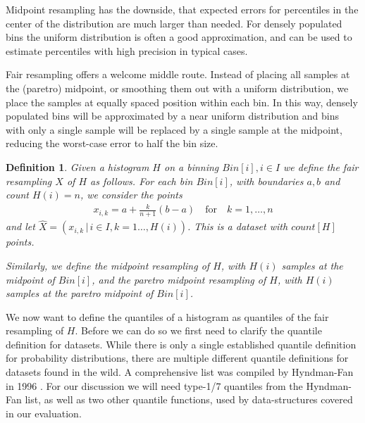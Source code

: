 \documentclass{article}
\theoremstyle{plain}
\newtheorem{definition}{Definition}[section]
\theoremstyle{remark}
\newcommand{\qtext}[1]{\quad\text{#1}\quad} %
\begin{document}
Midpoint resampling has the downside, that expected errors for percentiles in the center of the
distribution are much larger than needed. For densely populated bins the uniform distribution is
often a good approximation, and can be used to estimate percentiles with high precision in typical
cases.

Fair resampling offers a welcome middle route. Instead of placing all samples at the (paretro)
midpoint, or smoothing them out with a uniform distribution, we place the samples at equally
spaced position within each bin. In this way, densely populated bins will be approximated by a near
uniform distribution and bins with only a single sample will be replaced by a single sample at the
midpoint, reducing the worst-case error to half the bin size.

\begin{definition}
  Given a histogram $H$ on a binning $Bin[i], i \in I$ we define the fair resampling $X$ of $H$ as follows.
  For each bin $Bin[i]$, with boundaries $a,b$ and count $H(i)=n$, we consider the points
  \begin{align*}
    x_{i,k} = a + \frac{k}{n+1} (b-a) \qtext{for} k=1,\dots,n
  \end{align*}
  and let $\hat{X} = (x_{i,k} \,|\, i \in I, k = 1\dots,H(i))$. This is a dataset with $count[H]$ points.

  Similarly, we define the midpoint resampling of $H$, with $H(i)$ samples at the midpoint of $Bin[i]$,
  and the paretro midpoint resampling of $H$, with $H(i)$ samples at the paretro midpoint of $Bin[i]$.
\end{definition}

We now want to define the quantiles of a histogram as quantiles of the fair resampling of $H$.
Before we can do so we first need to clarify the quantile definition for datasets.
While there is only a single established quantile definition for probability distributions, there
are multiple different quantile definitions for datasets found in the wild.
A comprehensive list was compiled by Hyndman-Fan in 1996 \cite{HF1996}.
For our discussion we will need type-1/7 quantiles from the Hyndman-Fan list,
as well as two other quantile functions, used by data-structures covered in our evaluation.
\end{document}
